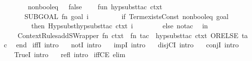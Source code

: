 \begin{isabellebody}
\ \ \ \ \ \ {\isacharbar}{\kern0pt}\ non{\isacharunderscore}{\kern0pt}bool{\isacharunderscore}{\kern0pt}eq\ {\isacharunderscore}{\kern0pt}\ {\isacharequal}{\kern0pt}\ false{\isacharsemicolon}{\kern0pt}\isanewline
\ \ \ \ fun\ hyp{\isacharunderscore}{\kern0pt}subst{\isacharunderscore}{\kern0pt}tac{\isacharprime}{\kern0pt}\ ctxt\ {\isacharequal}{\kern0pt}\isanewline
\ \ \ \ \ \ SUBGOAL\ {\isacharparenleft}{\kern0pt}fn\ {\isacharparenleft}{\kern0pt}goal{\isacharcomma}{\kern0pt}\ i{\isacharparenright}{\kern0pt}\ {\isacharequal}{\kern0pt}{\isachargreater}{\kern0pt}\isanewline
\ \ \ \ \ \ \ \ if\ Term{\isachardot}{\kern0pt}exists{\isacharunderscore}{\kern0pt}Const\ non{\isacharunderscore}{\kern0pt}bool{\isacharunderscore}{\kern0pt}eq\ goal\isanewline
\ \ \ \ \ \ \ \ then\ Hypsubst{\isachardot}{\kern0pt}hyp{\isacharunderscore}{\kern0pt}subst{\isacharunderscore}{\kern0pt}tac\ ctxt\ i\isanewline
\ \ \ \ \ \ \ \ else\ no{\isacharunderscore}{\kern0pt}tac{\isacharparenright}{\kern0pt}{\isacharsemicolon}{\kern0pt}\isanewline
\ \ in\isanewline
\ \ \ \ Context{\isacharunderscore}{\kern0pt}Rules{\isachardot}{\kern0pt}addSWrapper\ {\isacharparenleft}{\kern0pt}fn\ ctxt\ {\isacharequal}{\kern0pt}{\isachargreater}{\kern0pt}\ fn\ tac\ {\isacharequal}{\kern0pt}{\isachargreater}{\kern0pt}\ hyp{\isacharunderscore}{\kern0pt}subst{\isacharunderscore}{\kern0pt}tac{\isacharprime}{\kern0pt}\ ctxt\ ORELSE{\isacharprime}{\kern0pt}\ tac{\isacharparenright}{\kern0pt}\isanewline
\ \ end\isanewline
{\isacartoucheclose}%
\endisatagML
{\isafoldML}%
%
\isadelimML
%
\endisadelimML
\isanewline
\isanewline
{}\isamarkupfalse%
\ iffI\ {\isacharbrackleft}{\kern0pt}intro{\isacharbang}{\kern0pt}{\isacharbrackright}{\kern0pt}\isanewline
\ \ \ notI\ {\isacharbrackleft}{\kern0pt}intro{\isacharbang}{\kern0pt}{\isacharbrackright}{\kern0pt}\isanewline
\ \ \ impI\ {\isacharbrackleft}{\kern0pt}intro{\isacharbang}{\kern0pt}{\isacharbrackright}{\kern0pt}\isanewline
\ \ \ disjCI\ {\isacharbrackleft}{\kern0pt}intro{\isacharbang}{\kern0pt}{\isacharbrackright}{\kern0pt}\isanewline
\ \ \ conjI\ {\isacharbrackleft}{\kern0pt}intro{\isacharbang}{\kern0pt}{\isacharbrackright}{\kern0pt}\isanewline
\ \ \ TrueI\ {\isacharbrackleft}{\kern0pt}intro{\isacharbang}{\kern0pt}{\isacharbrackright}{\kern0pt}\isanewline
\ \ \ refl\ {\isacharbrackleft}{\kern0pt}intro{\isacharbang}{\kern0pt}{\isacharbrackright}{\kern0pt}\isanewline
\isanewline
{}\isamarkupfalse%
\ iffCE\ {\isacharbrackleft}{\kern0pt}elim{\isacharbang}{\kern0pt}{\isacharbrackright}{\kern0pt}\isanewline

\end{isabellebody}
